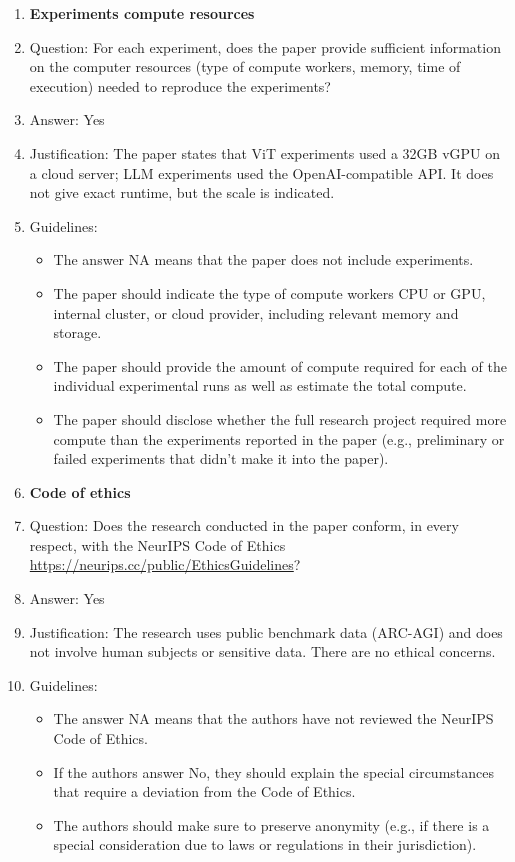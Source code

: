 \documentclass{article}
\newcommand{\answerYes}[1][]{Yes}
\begin{document}
\begin{enumerate}
\item {\bf Experiments compute resources}
    \item[] Question: For each experiment, does the paper provide sufficient information on the computer resources (type of compute workers, memory, time of execution) needed to reproduce the experiments?
    \item[] Answer: \answerYes{}
    \item[] Justification: The paper states that ViT experiments used a 32GB vGPU on a cloud server; LLM experiments used the OpenAI-compatible API. It does not give exact runtime, but the scale is indicated.
    \item[] Guidelines:
    \begin{itemize}
        \item The answer NA means that the paper does not include experiments.
        \item The paper should indicate the type of compute workers CPU or GPU, internal cluster, or cloud provider, including relevant memory and storage.
        \item The paper should provide the amount of compute required for each of the individual experimental runs as well as estimate the total compute. 
        \item The paper should disclose whether the full research project required more compute than the experiments reported in the paper (e.g., preliminary or failed experiments that didn't make it into the paper). 
    \end{itemize}
    
\item {\bf Code of ethics}
    \item[] Question: Does the research conducted in the paper conform, in every respect, with the NeurIPS Code of Ethics \url{https://neurips.cc/public/EthicsGuidelines}?
    \item[] Answer: \answerYes{}
    \item[] Justification: The research uses public benchmark data (ARC-AGI) and does not involve human subjects or sensitive data. There are no ethical concerns.
    \item[] Guidelines:
    \begin{itemize}
        \item The answer NA means that the authors have not reviewed the NeurIPS Code of Ethics.
        \item If the authors answer No, they should explain the special circumstances that require a deviation from the Code of Ethics.
        \item The authors should make sure to preserve anonymity (e.g., if there is a special consideration due to laws or regulations in their jurisdiction).
    \end{itemize}


\end{enumerate}
\end{document}
